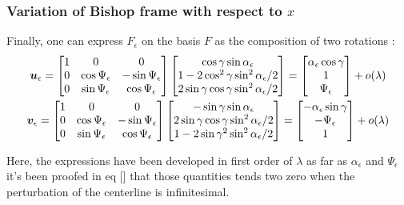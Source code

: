 \subsubsection{Variation of Bishop frame with respect to $x$}
Finally, one can express $F_\epsilon$ on the basis $F$ as the composition of two rotations :
\begin{subequations}
	\begin{gather}
	\boldsymbol{u}_\epsilon =
	\begin{bmatrix}
		1 & 0 & 0 \\
		0 & \cos{\Psi_\epsilon} & -\sin{\Psi_\epsilon} \\
		0 & \sin{\Psi_\epsilon} & \cos{\Psi_\epsilon}
	\end{bmatrix}
	\begin{bmatrix}
		\cos{\gamma}\sin{\alpha_\epsilon} \\
		1-2\cos^2{\gamma}\sin^2{\alpha_\epsilon/2} \\
		2\sin{\gamma}\cos{\gamma}\sin^2{\alpha_\epsilon/2}
	\end{bmatrix}
	=
	\begin{bmatrix}
		\alpha_\epsilon\cos{\gamma}\\
		1 \\
		\Psi_\epsilon
	\end{bmatrix}
	+ o(\lambda)
	\\
	\boldsymbol{v}_\epsilon =
	\begin{bmatrix}
		1 & 0 & 0 \\
		0 & \cos{\Psi_\epsilon} & -\sin{\Psi_\epsilon} \\
		0 & \sin{\Psi_\epsilon} & \cos{\Psi_\epsilon}
	\end{bmatrix}
	\begin{bmatrix}
		-\sin{\gamma}\sin{\alpha_\epsilon} \\
		2\sin{\gamma}\cos{\gamma}\sin^2{\alpha_\epsilon/2} \\
		1-2\sin{\gamma}^2\sin^2{\alpha_\epsilon/2}
	\end{bmatrix}
	=
	\begin{bmatrix}
		-\alpha_\epsilon\sin{\gamma}\\
		-\Psi_\epsilon \\
		1
	\end{bmatrix}
	+ o(\lambda)
	\end{gather}
\end{subequations}

%
Here, the expressions have been developed in first order of $\lambda$ as far as $\alpha_\epsilon$ and $\Psi_\epsilon$ it's been proofed in eq [] that those quantities tends two zero when the perturbation of the centerline is infinitesimal.

